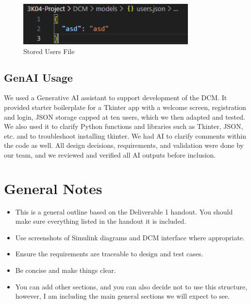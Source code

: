 \documentclass{article}
\begin{document}
\begin{tcolorbox}
    \begin{figure}[H]\label{saveduser}
        \centering
        \includegraphics[width=0.8\textwidth]{saveduser.png}
        \caption{Stored Users File}
    \end{figure}
\end{tcolorbox}



\newpage
\subsection{GenAI Usage}

We used a Generative AI assistant to support development of the DCM. It provided starter boilerplate for a 
Tkinter app with a welcome screen, registration and login, JSON storage capped at ten users, which we then 
adapted and tested. We also used it to clarify Python functions and libraries such as Tkinter, JSON, etc. 
and to troubleshoot installing tkinter. We had AI to clarify comments within the code as well. All design 
decisions, requirements, and validation were done by our team, and we reviewed and verified all AI outputs 
before inclusion. 


\section{General Notes}
\begin{itemize}
    \item This is a general outline based on the Deliverable 1 handout. You should make sure everything listed in the handout it is included. 
    \item Use screenshots of Simulink diagrams and DCM interface where appropriate.
    \item Ensure the requirements are traceable to design and test cases.
    \item Be concise and make things clear.
    \item You can add other sections, and you can also decide not to use this structure, however, I am including the main general sections we will expect to see.
\end{itemize}
\end{document}

